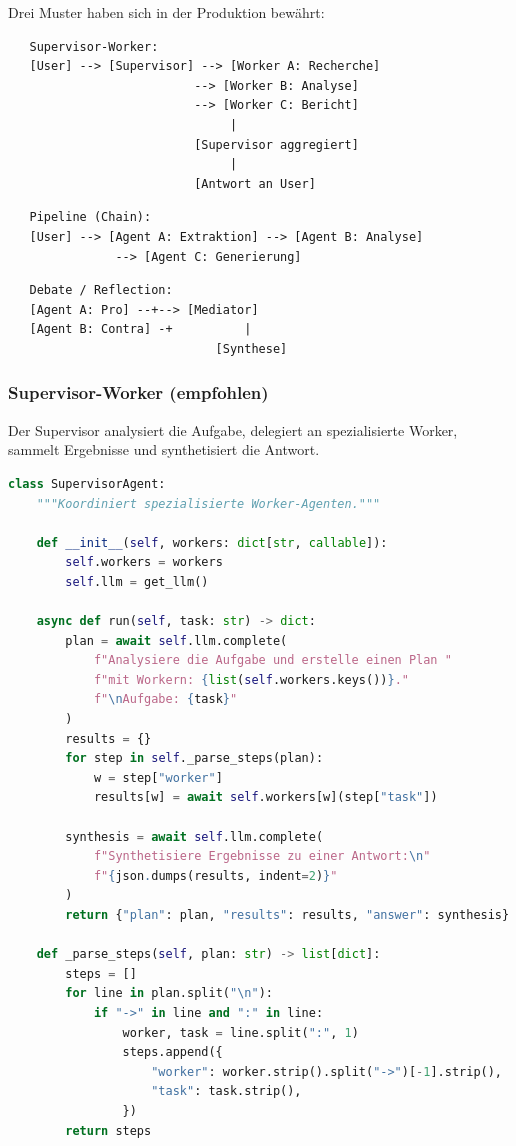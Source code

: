 Drei Muster haben sich in der Produktion bewährt:

\begin{verbatim}
   Supervisor-Worker:
   [User] --> [Supervisor] --> [Worker A: Recherche]
                          --> [Worker B: Analyse]
                          --> [Worker C: Bericht]
                               |
                          [Supervisor aggregiert]
                               |
                          [Antwort an User]
\end{verbatim}

\begin{verbatim}
   Pipeline (Chain):
   [User] --> [Agent A: Extraktion] --> [Agent B: Analyse]
               --> [Agent C: Generierung]
\end{verbatim}

\begin{verbatim}
   Debate / Reflection:
   [Agent A: Pro] --+--> [Mediator]
   [Agent B: Contra] -+          |
                             [Synthese]
\end{verbatim}

\subsubsection{Supervisor-Worker (empfohlen)}

Der Supervisor analysiert die Aufgabe, delegiert an spezialisierte Worker, sammelt Ergebnisse und synthetisiert die Antwort.

\begin{lstlisting}[language=Python, caption=Supervisor-Worker-Architektur]
class SupervisorAgent:
    """Koordiniert spezialisierte Worker-Agenten."""

    def __init__(self, workers: dict[str, callable]):
        self.workers = workers
        self.llm = get_llm()

    async def run(self, task: str) -> dict:
        plan = await self.llm.complete(
            f"Analysiere die Aufgabe und erstelle einen Plan "
            f"mit Workern: {list(self.workers.keys())}."
            f"\nAufgabe: {task}"
        )
        results = {}
        for step in self._parse_steps(plan):
            w = step["worker"]
            results[w] = await self.workers[w](step["task"])

        synthesis = await self.llm.complete(
            f"Synthetisiere Ergebnisse zu einer Antwort:\n"
            f"{json.dumps(results, indent=2)}"
        )
        return {"plan": plan, "results": results, "answer": synthesis}

    def _parse_steps(self, plan: str) -> list[dict]:
        steps = []
        for line in plan.split("\n"):
            if "->" in line and ":" in line:
                worker, task = line.split(":", 1)
                steps.append({
                    "worker": worker.strip().split("->")[-1].strip(),
                    "task": task.strip(),
                })
        return steps
\end{lstlisting}

